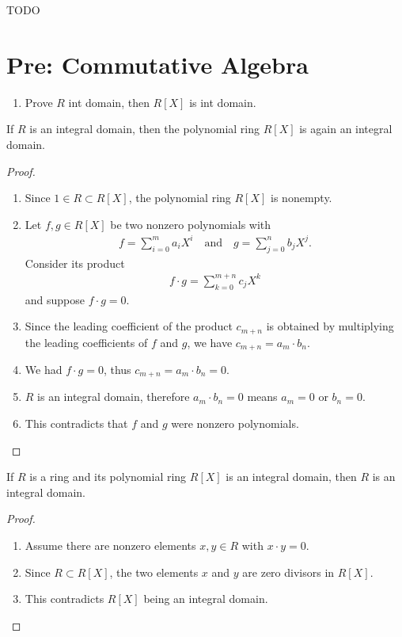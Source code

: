 TODO

\part{Pre: Commutative Algebra}

\begin{enumerate}
    \item Prove \(R\) int domain, then \(R[X]\) is int domain.
\end{enumerate}

\begin{proposition}
    If \(R\) is an integral domain, then the polynomial ring \(R[X]\) is again an integral domain.
\end{proposition}
\begin{proof}
    \begin{enumerate}
        \item Since \(1 \in R \subset R[X]\), the polynomial ring \(R[X]\) is nonempty.
        \item Let \(f, g \in R[X]\) be two nonzero polynomials with
        \begin{align*}
            f = \sum_{i = 0}^{m} a_i X^i \quad \text{and} \quad g = \sum_{j = 0}^{n} b_j X^j \text{.}
        \end{align*}
        Consider its product
        \begin{align*}
            f \cdot g = \sum_{k = 0}^{m + n} c_j X^k
        \end{align*}
        and suppose \(f \cdot g = 0\).
        \item Since the leading coefficient of the product \(c_{m+n}\) is obtained by multiplying the leading coefficients of \(f\) and \(g\), we have \(c_{m+n} = a_m \cdot b_n\).
        \item We had \(f \cdot g = 0\), thus \(c_{m+n} = a_m \cdot b_n = 0\).
        \item \(R\) is an integral domain, therefore \(a_m \cdot b_n = 0\) means \(a_m = 0\) or \(b_n = 0\).
        \item This contradicts that \(f\) and \(g\) were nonzero polynomials.
    \end{enumerate}
\end{proof}

\begin{proposition}
    If \(R\) is a ring and its polynomial ring \(R[X]\) is an integral domain, then \(R\) is an integral domain.
\end{proposition}
\begin{proof}
    \begin{enumerate}
        \item Assume there are nonzero elements \(x, y \in R\) with \(x \cdot y = 0\).
        \item Since \(R \subset R[X]\), the two elements \(x\) and \(y\) are zero divisors in \(R[X]\).
        \item This contradicts \(R[X]\) being an integral domain.
    \end{enumerate}
\end{proof}

